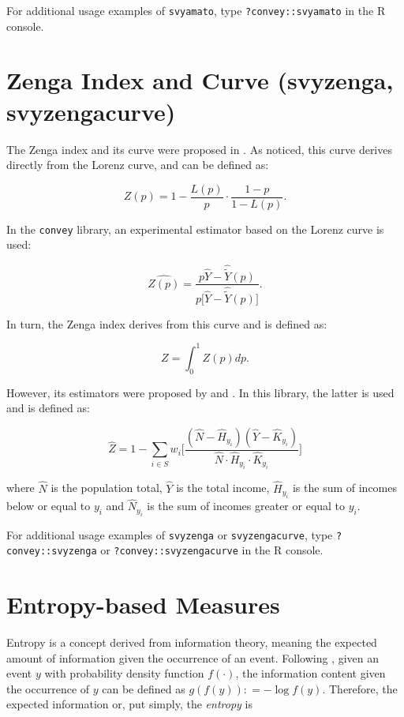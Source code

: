 \documentclass[]{book}
\begin{document}
For additional usage examples of \texttt{svyamato}, type
\texttt{?convey::svyamato} in the R console.

\section{Zenga Index and Curve (svyzenga,
svyzengacurve)}\label{zenga-index-and-curve-svyzenga-svyzengacurve}

The Zenga index and its curve were proposed in \citet{zenga2007}. As
\citet{polisicchio2011} noticed, this curve derives directly from the
Lorenz curve, and can be defined as:

\[
Z(p) = 1 - \frac{L(p)}{p} \cdot \frac{1 - p}{1 - L(p)}.
\]

In the \texttt{convey} library, an experimental estimator based on the
Lorenz curve is used:

\[
\widehat{Z(p)} = \frac{ p \widehat{Y} - \widehat{\widetilde{Y}}(p) }{p \big[ \widehat{Y} - \widehat{\widetilde{Y}}(p) \big] }.
\]

In turn, the Zenga index derives from this curve and is defined as:

\[
Z = \int_0^1 Z(p)dp.
\]

However, its estimators were proposed by \citet{langel2012} and
\citet{barabesi2016}. In this library, the latter is used and is defined
as:

\[
\widehat{Z} = 1 - \sum_{i \in S} w_i \bigg[ \frac{ ( \widehat{N} - \widehat{H}_{y_i} ) ( \widehat{Y} -\widehat{K}_{y_i} ) }
{ \widehat{N} \cdot \widehat{H}_{y_i} \cdot \widehat{K}_{y_i} } \bigg]
\]

where \(\widehat{N}\) is the population total, \(\widehat{Y}\) is the
total income, \(\widehat{H}_{y_i}\) is the sum of incomes below or equal
to \(y_i\) and \(\widehat{N}_{y_i}\) is the sum of incomes greater or
equal to \(y_i\).

For additional usage examples of \texttt{svyzenga} or
\texttt{svyzengacurve}, type \texttt{?convey::svyzenga} or
\texttt{?convey::svyzengacurve} in the R console.

\section{Entropy-based Measures}\label{entropy-based-measures}

Entropy is a concept derived from information theory, meaning the
expected amount of information given the occurrence of an event.
Following \citep{shannon1948}, given an event \(y\) with probability
density function \(f(\cdot)\), the information content given the
occurrence of \(y\) can be defined as \(g(f(y)) \colon= - \log f(y)\).
Therefore, the expected information or, put simply, the \emph{entropy}
is
\end{document}

